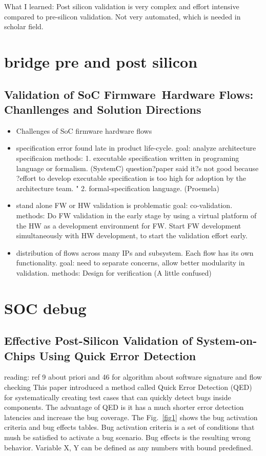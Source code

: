 \documentclass[conference]{IEEEtran}
\begin{document}
What I learned:
Post silicon validation is very complex and effort intensive compared to pre-silicon validation. Not very automated, which is needed in scholar field.

\section{bridge pre and post silicon}
\subsection{Validation of SoC Firmware~Hardware Flows: Chanllenges and Solution Directions ~\cite{fw}}
\begin{itemize}
	\item Challenges of SoC firmware hardware flows
	\item specification error found late in product life-cycle.
		goal: analyze architecture specificaion
		methods: 1. executable specification written in programing language or formalism. (SystemC)
				question?paper said it?s not good because ?effort to develop executable specification is too high for adoption by the 						architecture team. "
				2. formal-specification language. (Proemela)

	\item stand alone FW or HW validation is problematic
		goal: co-validation. 
		methods: Do FW validation in the early stage by using a virtual platform of the HW as a development environment for FW. Start FW 			development simultaneously with HW development, to start the validation effort early.

	\item distribution of flows across many IPs and subsystem. Each flow has its own functionality.
		goal: need to separate concerns, allow better modularity in validation.
		methods: Design for verification
				(A little confused)
\end{itemize}

\section{SOC debug}
\subsection{Effective Post-Silicon Validation of System-on-Chips Using Quick Error Detection ~\cite{qed} }

{\color{red} reading: ref 9 about priori and 46 for algorithm about software signature and flow checking}
This paper introduced a method called Quick Error Detection (QED) for systematically creating test cases that can quickly detect bugs inside components.
The advantage of QED is it has a much shorter error detection latencies and increase the bug coverage.
The Fig.~\ref{fig1} shows the bug activation criteria and bug effects tables. Bug activation criteria is a set of conditions that mush be satisfied to activate a bug scenario. Bug effects is the resulting wrong behavior. Variable X, Y can be defined as any numbers with bound predefined.
\end{document}
